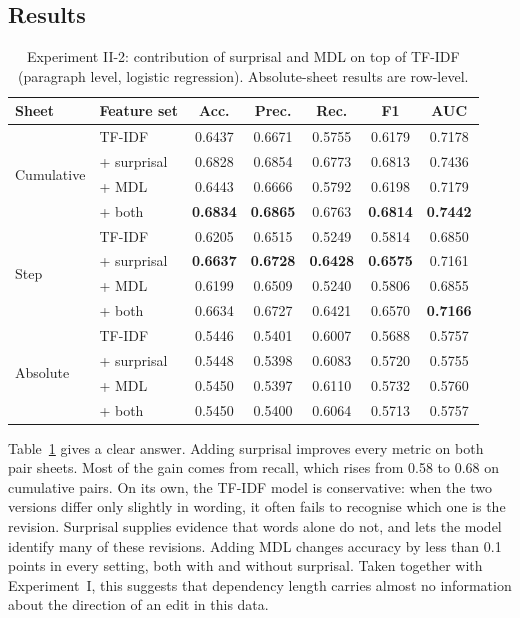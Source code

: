 \documentclass[12pt,a4paper,oneside]{report}
\begin{document}
\subsection{Results}
\begin{table}[ht]
\centering
\small
\caption[Experiment II-2: surprisal and MDL over TF-IDF]{Experiment II-2: contribution of surprisal and MDL on top of TF-IDF (paragraph level, logistic regression). Absolute-sheet results are row-level.}
\label{tab:exp2}
\begin{tabular}{@{}llccccc@{}}
\toprule
Sheet & Feature set & Acc. & Prec. & Rec. & F1 & AUC\\
\midrule
\multirow{4}{*}{Cumulative} & TF-IDF & 0.6437 & 0.6671 & 0.5755 & 0.6179 & 0.7178\\
 & + surprisal & 0.6828 & 0.6854 & 0.6773 & 0.6813 & 0.7436\\
 & + MDL & 0.6443 & 0.6666 & 0.5792 & 0.6198 & 0.7179\\
 & + both & \textbf{0.6834} & \textbf{0.6865} & 0.6763 & \textbf{0.6814} & \textbf{0.7442}\\
\midrule
\multirow{4}{*}{Step} & TF-IDF & 0.6205 & 0.6515 & 0.5249 & 0.5814 & 0.6850\\
 & + surprisal & \textbf{0.6637} & \textbf{0.6728} & \textbf{0.6428} & \textbf{0.6575} & 0.7161\\
 & + MDL & 0.6199 & 0.6509 & 0.5240 & 0.5806 & 0.6855\\
 & + both & 0.6634 & 0.6727 & 0.6421 & 0.6570 & \textbf{0.7166}\\
\midrule
\multirow{4}{*}{Absolute} & TF-IDF & 0.5446 & 0.5401 & 0.6007 & 0.5688 & 0.5757\\
 & + surprisal & 0.5448 & 0.5398 & 0.6083 & 0.5720 & 0.5755\\
 & + MDL & 0.5450 & 0.5397 & 0.6110 & 0.5732 & 0.5760\\
 & + both & 0.5450 & 0.5400 & 0.6064 & 0.5713 & 0.5757\\
\bottomrule
\end{tabular}
\end{table}

Table~\ref{tab:exp2} gives a clear answer. Adding surprisal improves every metric on both pair sheets. Most of the gain comes from recall, which rises from 0.58 to 0.68 on cumulative pairs. On its own, the TF-IDF model is conservative: when the two versions differ only slightly in wording, it often fails to recognise which one is the revision. Surprisal supplies evidence that words alone do not, and lets the model identify many of these revisions. Adding MDL changes accuracy by less than 0.1 points in every setting, both with and without surprisal. Taken together with Experiment~I, this suggests that dependency length carries almost no information about the direction of an edit in this data.
\end{document}
